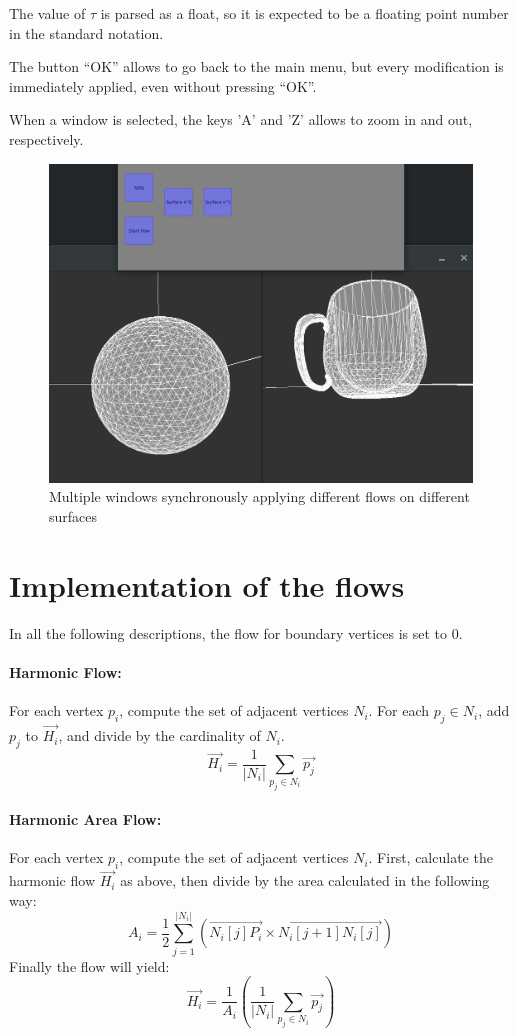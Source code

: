 \documentclass{article}
\begin{document}
The value of $\tau$ is parsed as a float, so it is expected to be a floating point
number in the standard notation.

The button ``OK'' allows to go back to the main menu, but every modification
is immediately applied, even without pressing ``OK''.

When a window is selected, the keys 'A' and 'Z' allows to zoom in and out, respectively.

\begin{figure}[h]
  \begin{center}
    \includegraphics[width=.5\textwidth]{img/mult.png}
    \caption{Multiple windows synchronously applying different flows on different surfaces}
    \label{fig:mult}
  \end{center}
\end{figure}

\section*{Implementation of the flows}

In all the following descriptions, the flow for boundary vertices is set to 0.

\paragraph*{Harmonic Flow:}
For each vertex $p_i$, compute the set of adjacent vertices $N_i$.
For each $p_j \in N_i$, add $p_j$ to $\overrightarrow{H_i}$, and divide by
the cardinality of $N_i$.
\begin{equation*}
  \overrightarrow{H_i}=\frac{1}{|N_i|} \sum_{p_j \in N_i} \overrightarrow{p_j}
\end{equation*}

\paragraph*{Harmonic Area Flow:}
For each vertex $p_i$, compute the set of adjacent vertices $N_i$.
First, calculate the harmonic flow $\overrightarrow{H_i}$ as above, then divide by the area
calculated in the following way:
\begin{equation*}
  A_i = \frac{1}{2} \sum_{j = 1}^{|N_i|} (\overrightarrow{N_i[j] P_i} \times \overrightarrow{N_i[j+1] N_i[j]} )
\end{equation*}
Finally the flow will yield:
\begin{equation*}
  \overrightarrow{H_i}=\frac{1}{A_i} \left( \frac{1}{|N_i|} \sum_{p_j \in N_i} \overrightarrow{p_j} \right)
\end{equation*}
\end{document}
